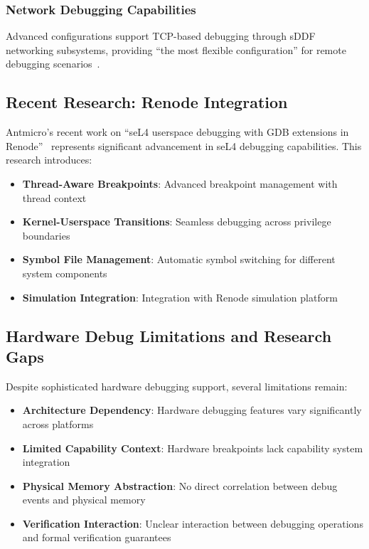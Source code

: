 \documentclass[11pt,a4paper]{article}
\begin{document}
\subsubsection{Network Debugging Capabilities}

Advanced configurations support TCP-based debugging through sDDF networking subsystems, providing ``the most flexible configuration'' for remote debugging scenarios~\cite{libgdb-github}.

\subsection{Recent Research: Renode Integration}

Antmicro's recent work on ``seL4 userspace debugging with GDB extensions in Renode''~\cite{antmicro-renode-sel4} represents significant advancement in seL4 debugging capabilities. This research introduces:

\begin{itemize}
\item \textbf{Thread-Aware Breakpoints}: Advanced breakpoint management with thread context
\item \textbf{Kernel-Userspace Transitions}: Seamless debugging across privilege boundaries  
\item \textbf{Symbol File Management}: Automatic symbol switching for different system components
\item \textbf{Simulation Integration}: Integration with Renode simulation platform
\end{itemize}

\subsection{Hardware Debug Limitations and Research Gaps}

Despite sophisticated hardware debugging support, several limitations remain:

\begin{itemize}
\item \textbf{Architecture Dependency}: Hardware debugging features vary significantly across platforms
\item \textbf{Limited Capability Context}: Hardware breakpoints lack capability system integration
\item \textbf{Physical Memory Abstraction}: No direct correlation between debug events and physical memory
\item \textbf{Verification Interaction}: Unclear interaction between debugging operations and formal verification guarantees
\end{itemize}
\end{document}
